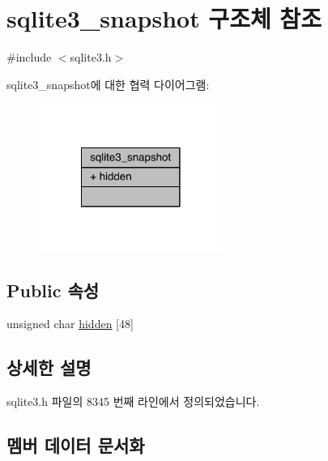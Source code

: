 \hypertarget{structsqlite3__snapshot}{}\section{sqlite3\+\_\+snapshot 구조체 참조}
\label{structsqlite3__snapshot}


{\ttfamily \#include $<$sqlite3.\+h$>$}



sqlite3\+\_\+snapshot에 대한 협력 다이어그램\+:
\nopagebreak
\begin{figure}[H]
\begin{center}
\leavevmode
\includegraphics[width=170pt]{structsqlite3__snapshot__coll__graph}
\end{center}
\end{figure}
\subsection*{Public 속성}
\begin{DoxyCompactItemize}
\item 
unsigned char \hyperlink{structsqlite3__snapshot_aeed328b50a9580e9a91d0bf10612be4e}{hidden} \mbox{[}48\mbox{]}
\end{DoxyCompactItemize}


\subsection{상세한 설명}


sqlite3.\+h 파일의 8345 번째 라인에서 정의되었습니다.



\subsection{멤버 데이터 문서화}
\mbox{\label{structsqlite3__snapshot_aeed328b50a9580e9a91d0bf10612be4e}} 
